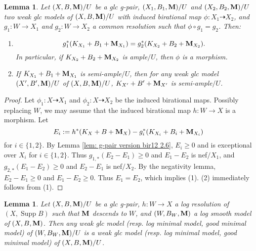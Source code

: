 \documentclass[11pt]{amsart}
\numberwithin{equation}{section}
\newcommand{\Mm}{{\bf{M}}}
\newcommand{\Supp}{\operatorname{Supp}}
\newtheorem{lem}[thm]{Lemma}
\theoremstyle{definition}
\theoremstyle{definition}
\theoremstyle{definition}
\begin{document}
\begin{lem}\label{lem: g-pair version bir12 2.7}
Let $(X,B,\Mm)/U$ be a glc g-pair, $(X_1,B_1,\Mm)/U$ and $(X_2,B_2,\Mm)/U$ two weak glc models of $(X,B,\Mm)/U$ with induced birational map $\phi: X_1\dashrightarrow X_2$, and $g_1: W\rightarrow X_1$ and $g_2: W\rightarrow X_2$ a common resolution such that $\phi\circ g_1=g_2$. Then:
\begin{enumerate}
    \item $$g_1^*(K_{X_1}+B_1+\Mm_{X_1})=g_2^*(K_{X_2}+B_2+\Mm_{X_2}).$$
    In particular, if $K_{X_2}+B_2+\Mm_{X_2}$ is ample$/U$, then $\phi$ is a morphism.
    \item If $K_{X_1}+B_1+\Mm_{X_1}$ is semi-ample$/U$, then for any weak glc model $(X',B',\Mm)/U$ of $(X,B,\Mm)/U$, $K_{X'}+B'+\Mm_{X'}$ is semi-ample$/U$.
\end{enumerate}
\end{lem}
\begin{proof}
Let $\phi_1: X\dashrightarrow X_1$ and $\phi_2: X\dashrightarrow X_2$ be the induced birational maps. Possibly replacing $W$, we may assume that the induced birational map $h: W\rightarrow X$ is a morphism. Let $$E_i:=h^*(K_X+B+\Mm_X)-g_i^*(K_{X_i}+B_i+\Mm_{X_i})$$
for $i\in\{1,2\}$. By Lemma \ref{lem: g-pair version bir12 2.6}, $E_i\geq 0$ and is exceptional over $X_i$ for $i\in\{1,2\}$. Thus $g_{1,*}(E_2-E_1)\geq 0$ and $E_1-E_2$ is nef$/X_1$, and $g_{2,*}(E_1-E_2)\geq 0$ and $E_2-E_1$ is nef$/X_2$. By the negativity lemma, $E_2-E_1\geq 0$ and $E_1-E_2\geq 0$. Thus $E_1=E_2$, which implies (1). (2) immediately follows from (1).
\end{proof}




\begin{lem}\label{lem: g-pair version bir12 2.8}
Let $(X,B,\Mm)/U$ be a glc g-pair, $h: W\rightarrow X$ a log resolution of $(X,\Supp B)$ such that $\Mm$ descends to $W$, and $(W,B_W,\Mm)$ a log smooth model of $(X,B,\Mm)$. Then any weak glc model (resp. log minimal model, good minimal model) of $(W,B_W,\Mm)/U$ is a weak glc model (resp. log minimal model, good minimal model) of $(X,B,\Mm)/U$. 
\end{lem}
\end{document}
